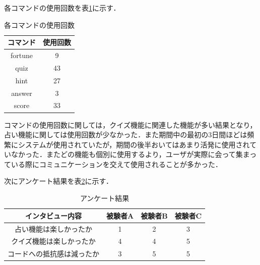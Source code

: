 各コマンドの使用回数を表\ref{command}に示す．

\begin{table}[h]
  \centering
  \caption{各コマンドの使用回数}
  \label{command}
    \begin{tabular}{|c|c|} \hline
      コマンド & 使用回数 \\ \hline \hline
      fortune & 9 \\ \hline
      quiz & 43 \\ \hline
      hint & 27 \\ \hline
      answer & 3 \\ \hline
      score & 33 \\ \hline
    \end{tabular}
\end{table}

コマンドの使用回数に関しては，クイズ機能に関連した機能が多い結果となり，占い機能に関しては使用回数が少なかった．また期間中の最初の3日間ほどは頻繁にシステムが使用されていたが，期間の後半おいてはあまり活発に使用されていなかった．またどの機能も個別に使用するより，ユーザが実際に会って集まっている際にコミュニケーションを交えて使用されることが多かった．

次にアンケート結果を表\ref{interview}に示す．
\begin{table}[h]
  \centering
  \caption{アンケート結果}
  \label{interview}
    \begin{tabular}{|c|c|c|c|} \hline
      インタビュー内容 & 被験者A & 被験者B & 被験者C \\ \hline \hline
      占い機能は楽しかったか & 1 & 2 & 3 \\ \hline
      クイズ機能は楽しかったか & 4 & 4 & 5 \\ \hline
      コードへの抵抗感は減ったか & 3 & 5 &5 \\ \hline
    \end{tabular}
\end{table}

